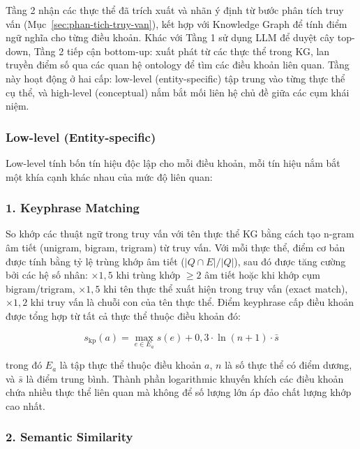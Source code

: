 Tầng 2 nhận các thực thể đã trích xuất và nhãn ý định từ bước phân tích truy vấn
(Mục~\ref{sec:phan-tich-truy-van}), kết hợp với Knowledge Graph để tính điểm ngữ
nghĩa cho từng điều khoản. Khác với Tầng 1 sử dụng LLM để duyệt cây top-down,
Tầng 2 tiếp cận bottom-up: xuất phát từ các thực thể trong KG, lan truyền điểm số
qua các quan hệ ontology để tìm các điều khoản liên quan. Tầng này hoạt động ở hai
cấp: low-level (entity-specific) tập trung vào từng thực thể cụ thể, và high-level
(conceptual) nắm bắt mối liên hệ chủ đề giữa các cụm khái niệm.

\subsubsection{Low-level (Entity-specific)}
\label{subsubsec:low-level}

Low-level tính bốn tín hiệu độc lập cho mỗi điều khoản, mỗi tín hiệu nắm bắt một
khía cạnh khác nhau của mức độ liên quan:

\subsubsection*{1. Keyphrase Matching}

So khớp các thuật ngữ trong truy vấn với tên thực thể KG bằng cách tạo n-gram âm
tiết (unigram, bigram, trigram) từ truy vấn. Với mỗi thực thể, điểm cơ bản được
tính bằng tỷ lệ trùng khớp âm tiết ($|Q \cap E| / |Q|$), sau đó được tăng cường
bởi các hệ số nhân: $\times 1{,}5$ khi trùng khớp $\geq 2$ âm tiết hoặc khi khớp
cụm bigram/trigram, $\times 1{,}5$ khi tên thực thể xuất hiện trong truy vấn
(exact match), $\times 1{,}2$ khi truy vấn là chuỗi con của tên thực thể. Điểm
keyphrase cấp điều khoản được tổng hợp từ tất cả thực thể thuộc điều khoản đó:

\begin{equation}
  s_\text{kp}(a) = \max_{e \in E_a} s(e) + 0{,}3 \cdot \ln(n+1) \cdot \bar{s}
  \label{eq:keyphrase-score}
\end{equation}

\noindent trong đó $E_a$ là tập thực thể thuộc điều khoản $a$, $n$ là số thực thể
có điểm dương, và $\bar{s}$ là điểm trung bình. Thành phần logarithmic khuyến
khích các điều khoản chứa nhiều thực thể liên quan mà không để số lượng lớn áp
đảo chất lượng khớp cao nhất.

\subsubsection*{2. Semantic Similarity}

